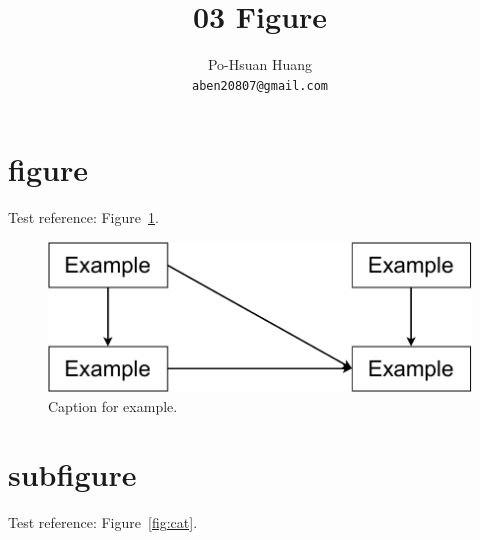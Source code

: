 \documentclass[12pt, a4paper]{article}
\title{03 Figure}
\author{Po-Hsuan Huang\\ 
    \texttt{aben20807@gmail.com}
}
\begin{document}
\vspace*{-50pt}
    {\let\newpage\relax\maketitle}

\section{figure}

Test reference: Figure~\ref{fig:example}.

\begin{figure}[ht]
    \centering
    \includegraphics[width=.48\linewidth]{figures/paper-example.pdf}
    \caption{Caption for example.}\label{fig:example}
\end{figure}

\section{subfigure}

Test reference: Figure~\ref{fig:cat}.
\end{document}
